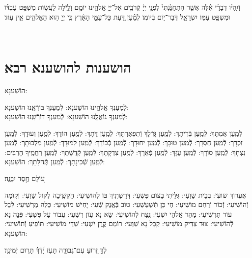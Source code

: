 \documentclass[twoside, openany, parskip=half, 11pt]{book}
\begin{document}
וְֿיִֽהְי֨וּ דְבָרַ֜י אֵ֗לֶּה אֲשֶׁ֤ר הִתְחַנַּ֙נְתִּי֙ לִפְנֵ֣י יְיָ֔ קְֿרֹבִ֛ים אֶל־יְיָ֥ אֱלֹהֵ֖ינוּ יוֹמָ֣ם וָלָ֑יְֿלָה לַעֲשׂ֣וֹת מִשְׁפַּ֣ט עַבְדּ֗וֹ וּמִשְׁפַּ֛ט עַמּ֥וֹ יִשְׂרָאֵ֖ל דְּֿבַר־י֥וֹם בְּֿיוֹמֽוֹ׃ לְֿמַ֗עַן דַּ֚עַת כָּל־עַמֵּ֣י הָאָ֔רֶץ כִּ֥י יְיָ֖ ה֣וּא הָאֱלֹהִ֑ים אֵ֖ין עֽוֹד׃

\vfill
{}\\

\clearpage

\vspace{-1\baselineskip}
\section[הושענות להושענא רבא]{ הושענות להושענא רבא }

\begin{Large}
הוֹשַׁענָא:
\end{Large}


לְֿמַעַנְךָ אֱלֹהֵֽינוּ הוֹשַׁענָא: לְֿמַעַנְךָ בּוֹרְֿאֵֽנוּ הוֹשַׁענָא:\\
לְֿמַעַנְךָ גּוֹאֲלֵֽנוּ הוֹשַׁענָא: לְֿמַעַנְךָ דּוֹרְֿשֵֽׁנוּ הוֹשַׁענָא:

לְֿמַֽעַן אֲמִתָּךְ: לְֿמַֽעַן בְּֿרִיתָךְ: לְֿמַֽעַן גָּדְֿלָךְ וְֿתִפְאַרְתָּךְ: לְֿמַֽעַן דָּתָךְ: לְֿמַֽעַן הוֹדָךְ: לְֿמַֽעַן וִעוּדָךְ: לְֿמַֽעַן זִכְרָךְ: לְֿמַֽעַן חַסְדָּךְ: לְֿמַֽעַן טוּבָךְ: לְֿמַֽעַן יִחוּדָךְ: לְֿמַֽעַן כְּֿבוֹדָךְ: לְֿמַֽעַן לִמּוּדָךְ: לְֿמַֽעַן מַלְכוּתָךְ: לְֿמַֽעַן נִצְחָךְ: לְֿמַֽעַן סוֹדָךְ: לְֿמַֽעַן עֻזָּךְ: לְֿמַֽעַן פְּֿאֵרָךְ: לְֿמַֽעַן צִדְקָתָךְ: לְֿמַֽעַן קְֿדֻשָּׁתָךְ: לְֿמַֽעַן רַחֲמֶֽיךָ הָרַבִּים:
לְֿמַֽעַן שְֿׁכִינָתָךְ:
לְֿמַֽעַן תְּֿהִלָּתָךְ: הוֹשַׁענָא:

ע֭וֹלָם חֶ֣סֶד יִבָּנֶ֑ה׃

אֶעֱרוֹךְ שׁוּעִי: בְּֿבֵית שַׁוְעִי: גִּלִּֽיתִי בַצּוֹם פִּשְׁעִי: דְּֿרַשְׁתִּֽיךָ בּוֹ לְֿהוֹשִׁיעִי: הַקְשִֽׁיבָה לְֿקוֹל שַׁוְעִי: וְֿקֽוּמָה וְֿהוֹשִׁיעִי: זְֿכוֹר וְֿרַחֵם מוֹשִׁיעִי: חַי כֵּן תְּֿשַׁעְשְׁעִי: טוֹב בְּֿאֶֽנֶק שְֿׁעִי: יָחִישׁ מוֹשִׁיעִי: כַּלֵּה מַרְשִׁיעִי: לְֿבַל עוֹד תַּרְשִׁיעִי: מַהֵר אֱלֹהֵי יִשְׁעִי: נֶֽצַח לְֿהוֹשִׁיעִי: שָׂא נָא עֲוֹן רִשְׁעִי: עֲבוֹר עַל פִּשְׁעִי: פְּֿנֵה נָא לְֿהוֹשִׁיעִי: צוּר צַדִּיק מוֹשִׁיעִי: קַבֵּל נָא שַׁוְעִי: רוֹמֵם קֶֽרֶן יִשְׁעִי:
שַׁדַּי מוֹשִׁיעִי:
תּוֹפִֽיעַ וְֿתוֹשִׁיעִי: הוֹשַׁענָא:

לְֿךָ֣ זְ֭רוֹעַ עִם־גְּבוּרָ֑ה תָּעֹ֥ז יָ֝דְֿךָ֗ תָּר֥וּם יְֿמִינֶֽךָ׃
\end{document}
